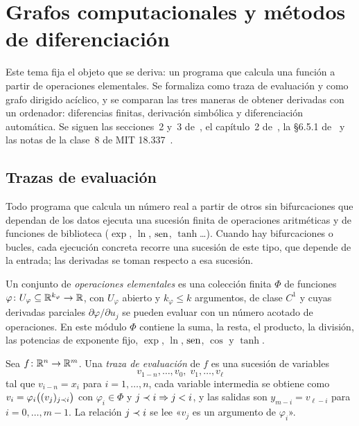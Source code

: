 \chapter{Grafos computacionales y métodos de diferenciación}
\label{tema:1}

Este tema fija el objeto que se deriva: un programa que calcula una función a partir de operaciones elementales. Se formaliza como traza de evaluación y como grafo dirigido acíclico, y se comparan las tres maneras de obtener derivadas con un ordenador: diferencias finitas, derivación simbólica y diferenciación automática. Se siguen las secciones~2 y~3 de~\cite{baydin}, el capítulo~2 de~\cite{gw}, la §6.5.1 de~\cite{gbc} y las notas de la clase~8 de MIT 18.337~\cite{mit18337}.

\section{Trazas de evaluación}

Todo programa que calcula un número real a partir de otros sin bifurcaciones que dependan de los datos ejecuta una sucesión finita de operaciones aritméticas y de funciones de biblioteca ($\exp$, $\ln$, $\operatorname{sen}$, $\tanh$\dots). Cuando hay bifurcaciones o bucles, cada ejecución concreta recorre una sucesión de este tipo, que depende de la entrada; las derivadas se toman respecto a esa sucesión.

\begin{definicion}\label{def:elementales}
Un conjunto de \emph{operaciones elementales} es una colección finita $\Phi$ de funciones $\varphi\colon U_\varphi\subseteq\mathbb{R}^{k_\varphi}\to\mathbb{R}$, con $U_\varphi$ abierto y $k_\varphi\le k$ argumentos, de clase $C^{1}$ y cuyas derivadas parciales $\partial\varphi/\partial u_j$ se pueden evaluar con un número acotado de operaciones. En este módulo $\Phi$ contiene la suma, la resta, el producto, la división, las potencias de exponente fijo, $\exp$, $\ln$, $\operatorname{sen}$, $\cos$ y $\tanh$.
\end{definicion}

\begin{definicion}\label{def:traza}
Sea $f\colon\mathbb{R}^{n}\to\mathbb{R}^{m}$. Una \emph{traza de evaluación} de $f$ es una sucesión de variables
\[
v_{1-n},\dots,v_0,\;v_1,\dots,v_\ell
\]
tal que $v_{i-n}=x_i$ para $i=1,\dots,n$, cada variable intermedia se obtiene como $v_i=\varphi_i\bigl((v_j)_{j\prec i}\bigr)$ con $\varphi_i\in\Phi$ y $j\prec i\Rightarrow j<i$, y las salidas son $y_{m-i}=v_{\ell-i}$ para $i=0,\dots,m-1$. La relación $j\prec i$ se lee «$v_j$ es un argumento de $\varphi_i$».
\end{definicion}

